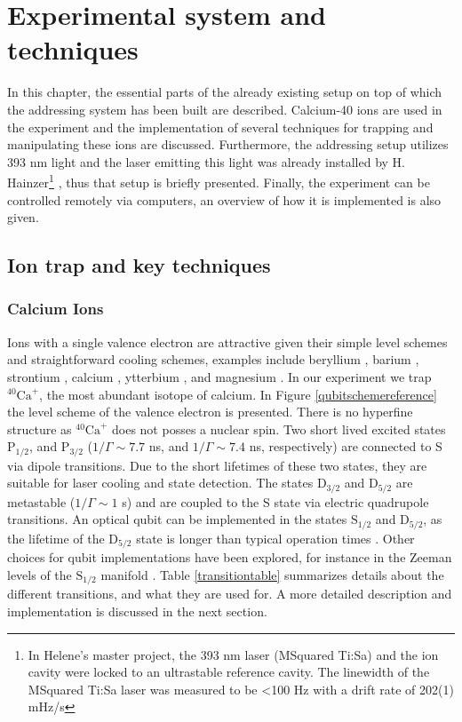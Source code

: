 
\chapter{Experimental system and techniques}
In this chapter, the essential parts of the already existing setup on top of which the addressing system has been built are described. Calcium-40 ions are used in the experiment and the implementation of several techniques for trapping and manipulating these ions are discussed. Furthermore, the addressing setup utilizes 393 nm light and the laser emitting this light was already installed by H. Hainzer\footnote{In Helene's master project, the 393 nm laser (MSquared Ti:Sa) and the ion cavity were locked to an ultrastable reference cavity. The linewidth of the MSquared Ti:Sa laser was measured to be <100 Hz with a drift rate of 202(1) mHz/s} \cite{helene}, thus that setup is briefly presented. Finally, the experiment can be controlled remotely via computers, an overview of how it is implemented is also given.

\section{Ion trap and key techniques}
\subsection{Calcium Ions}
\label{sec:calciumion}
Ions with a single valence electron are attractive given their simple level schemes and straightforward cooling schemes, examples include beryllium \cite{beryllium}, barium \cite{barium}, strontium \cite{strontium}, calcium \cite{calcium}, ytterbium \cite{PhysRevA.44.R20}, and magnesium \cite{magnesium}. In our experiment we trap $^{40}\text{Ca}^+$, the most abundant isotope of calcium. In Figure \ref{qubitschemereference} the level scheme of the valence electron is presented. There is no hyperfine structure as $^{40}\text{Ca}^+$ does not posses a nuclear spin. Two short lived excited states $\text{P}_{1/2}$, and $\text{P}_{3/2}$ ($1/\Gamma \sim 7.7$ ns, and $1/\Gamma \sim 7.4$ ns, respectively) are connected to S via dipole transitions. Due to the short lifetimes of these two states, they are suitable for laser cooling and state detection.
 The states $\text{D}_{3/2}$ and $\text{D}_{5/2}$ are metastable ($ 1/\Gamma \sim 1$ s) and are coupled to the S state via electric quadrupole transitions. An optical qubit can be implemented in the states $\text{S}_{1/2}$ and $\text{D}_{5/2}$, as the lifetime of the $\text{D}_{5/2}$ state is longer than typical operation times \cite{calciumqubit}. Other choices for qubit implementations have been explored, for instance in the Zeeman levels of the $\text{S}_{1/2}$ manifold \cite{Ruster2016}. Table \ref{transitiontable} summarizes details about the different transitions, and what they are used for. A more detailed description and implementation is discussed in the next section.


